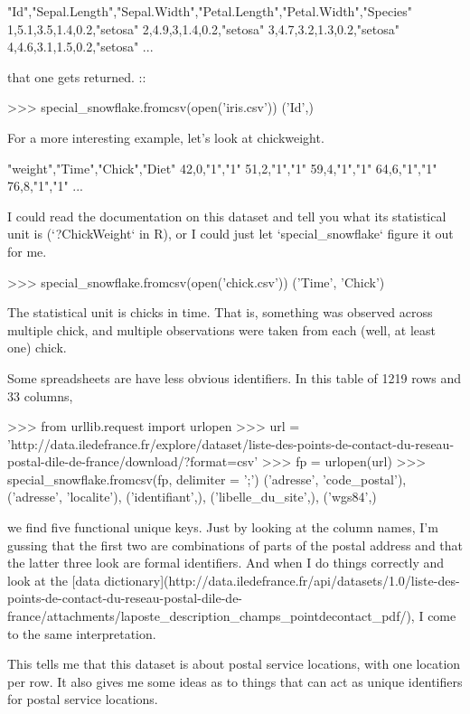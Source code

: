 \documentclass{acm_proc_article-sp}
\begin{document}
    "Id","Sepal.Length","Sepal.Width","Petal.Length","Petal.Width","Species"
    1,5.1,3.5,1.4,0.2,"setosa"
    2,4.9,3,1.4,0.2,"setosa"
    3,4.7,3.2,1.3,0.2,"setosa"
    4,4.6,3.1,1.5,0.2,"setosa"
    ...

that one gets returned. ::

    >>> special_snowflake.fromcsv(open('iris.csv'))                                                                  
    {('Id',)}

For a more interesting example, let's look at chickweight.

    "weight","Time","Chick","Diet"
    42,0,"1","1"
    51,2,"1","1"
    59,4,"1","1"
    64,6,"1","1"
    76,8,"1","1"
    ...

I could read the documentation on this dataset and tell you
what its statistical unit is (`?ChickWeight` in R), or I could
just let `special_snowflake` figure it out for me.

    >>> special_snowflake.fromcsv(open('chick.csv'))
    {('Time', 'Chick')}

The statistical unit is chicks in time. That is, something was
observed across multiple chick, and multiple observations were
taken from each (well, at least one) chick.

Some spreadsheets are have less obvious identifiers. In this
table of 1219 rows and 33 columns,

    >>> from urllib.request import urlopen
    >>> url = 'http://data.iledefrance.fr/explore/dataset/liste-des-points-de-contact-du-reseau-postal-dile-de-france/download/?format=csv'
    >>> fp = urlopen(url)
    >>> special_snowflake.fromcsv(fp, delimiter = ';')
    {('adresse', 'code_postal'),
     ('adresse', 'localite'),
     ('identifiant',),
     ('libelle_du_site',),
     ('wgs84',)}

we find five functional unique keys. Just by looking at the column names,
I'm gussing that the first two are combinations of parts of the postal address
and that the latter three look are formal identifiers.
And when I do things correctly and look at the
[data dictionary](http://data.iledefrance.fr/api/datasets/1.0/liste-des-points-de-contact-du-reseau-postal-dile-de-france/attachments/laposte_description_champs_pointdecontact_pdf/),
I come to the same interpretation.

This tells me that this dataset is about postal service locations,
with one location per row. It also gives me some ideas as to things that can
act as unique identifiers for postal service locations.
\end{document}
